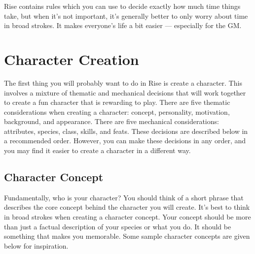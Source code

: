             Rise contains rules which you can use to decide exactly how much time things take, but when it's not important, it's generally better to only worry about time in broad strokes.
            It makes everyone's life a bit easier --- especially for the GM\@.

\section{Character Creation}

    The first thing you will probably want to do in Rise is create a character.
    This involves a mixture of thematic and mechanical decisions that will work together to create a fun character that is rewarding to play.
    There are five thematic considerations when creating a character: concept, personality, motivation, background, and appearance.
    There are five mechanical considerations: attributes, species, class, skills, and feats.
    These decisions are described below in a recommended order.
    However, you can make these decisions in any order, and you may find it easier to create a character in a different way.  

    \subsection{Character Concept}

        Fundamentally, who is your character?
        You should think of a short phrase that describes the core concept behind the character you will create.
        It's best to think in broad strokes when creating a character concept.
        Your concept should be more than just a factual description of your species or what you do.
        It should be something that makes you memorable.
        Some sample character concepts are given below for inspiration.

